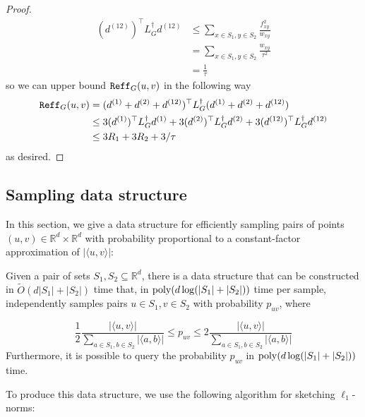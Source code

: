 \begin{proof}
\begin{align*}
(d^{(12)})^{\top} L_G^{\dag} d^{(12)} &\le \sum_{x\in S_1,y\in S_2} \frac{f_{xy}^2}{w_{xy}}\\
&= \sum_{x\in S_1,y\in S_2} \frac{w_{xy}}{\tau^2}\\
&= \frac{1}{\tau}
\end{align*}
so we can upper bound $\mathtt{Reff}_G(u,v)$ in the following way
\begin{align*}
\mathtt{Reff}_G(u,v) &= (d^{(1)} + d^{(2)} + d^{(12)})^{\top} L_G^{\dag} (d^{(1)} + d^{(2)} + d^{(12)})\\
&\le 3 (d^{(1)})^{\top} L_G^{\dag} d^{(1)} + 3 (d^{(2)})^{\top} L_G^{\dag} d^{(2)} + 3 (d^{(12)})^{\top} L_G^{\dag} d^{(12)}\\
&\le 3 R_1 + 3R_2 + 3/\tau
\end{align*}
as desired.
\end{proof}



\subsection{Sampling data structure}

In this section, we give a data structure for efficiently sampling pairs of points $(u,v)\in \mathbb{R}^d\times \mathbb{R}^d$ with probability proportional to a constant-factor approximation of $|\langle u,v\rangle|$:

\begin{lemma}\label{lem:simple-sampling-ds}
Given a pair of sets $S_1,S_2\subseteq \mathbb{R}^d$, there is a data structure that can be constructed in $\tilde{O}(d|S_1| + |S_2|)$ time that, in $\mathrm{poly}(d\log(|S_1| + |S_2|))$ time per sample, independently samples pairs $u\in S_1, v\in S_2$ with probability $p_{uv}$, where

$$\frac{1}{2} \frac{|\langle u,v\rangle|}{\sum_{a\in S_1,b\in S_2} |\langle a,b\rangle|}\le p_{uv}\le 2\frac{|\langle u,v\rangle|}{\sum_{a\in S_1,b\in S_2} |\langle a,b\rangle|}$$
Furthermore, it is possible to query the probability $p_{uv}$ in $\mathrm{poly}(d\log(|S_1| + |S_2|))$ time.
\end{lemma}

To produce this data structure, we use the following algorithm for sketching $\ell_1$-norms:

